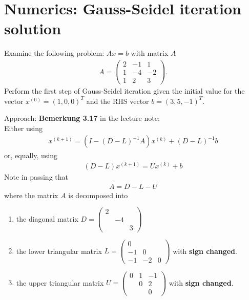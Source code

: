 \documentclass[12pt]{article}
\begin{document}
\newpage
\section{Numerics: Gauss-Seidel iteration solution}
\begin{example}
	Examine the following problem: $Ax = b$ with matrix $A$
	\begin{align}
		A =
		\begin{pmatrix}
			2 & -1 & 1  \\
			1 & -4 & -2 \\
			1 & 2  & 3
		\end{pmatrix}.
	\end{align}
	Perform the first step of Gauss-Seidel iteration given
	the initial value for the vector $x^{(0)} = (1, 0, 0)^T$
	and the RHS vector
	$b = (3, 5, -1)^T $.
\end{example}
Approach: \textbf{Bemerkung 3.17} in the lecture note:\\
Either using
\begin{align}
	\boxed{
		x^{(k+1)} = (I-(D-L)^{-1}A)x^{(k)} + (D-L)^{-1}b
	}
\end{align}
or, equally, using
\begin{align}
	\label{eq:GaussSeidelformular}
	\boxed{
		(D-L)x^{(k+1)} = Ux^{(k)} + b
	}
\end{align}
Note in passing that 
\begin{align}
	A = D - L - U
\end{align}
where the matrix $A$ is decomposed into 
\begin{enumerate}
	\item the diagonal matrix $
		      D = 
		      \begin{pmatrix}
			      2 &    &   \\
			        & -4 &   \\
			        &    & 3
		      \end{pmatrix}
	      $
	\item the lower triangular matrix $
		      L=
		      \begin{pmatrix}
			      0  &    &   \\
			      -1 & 0  &   \\
			      -1 & -2 & 0
		      \end{pmatrix}
	      $ with \textbf{sign changed}.
	\item the upper triangular matrix $
		      U =
		      \begin{pmatrix}
			      0 & 1 & -1 \\
			        & 0 & 2  \\
			        &   & 0
		      \end{pmatrix}
	      $ with \textbf{sign changed}.
\end{enumerate}
\end{document}

